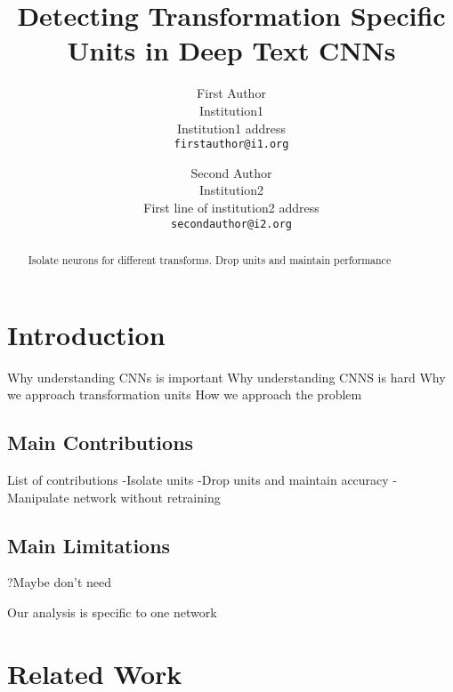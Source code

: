 \documentclass[10pt,twocolumn,letterpaper]{article}
\begin{document}
\title{Detecting Transformation Specific Units in Deep Text CNNs}

\author{First Author\\
Institution1\\
Institution1 address\\
{\tt\small firstauthor@i1.org}
\and
Second Author\\
Institution2\\
First line of institution2 address\\
{\tt\small secondauthor@i2.org}
}

\maketitle

\begin{abstract}
   Isolate neurons for different transforms.
   Drop units and maintain performance
\end{abstract}

\section{Introduction}

Why understanding CNNs is important
Why understanding CNNS is hard
Why we approach transformation units
How we approach the problem


\subsection{Main Contributions}

List of contributions
-Isolate units
-Drop units and maintain accuracy
-Manipulate network without retraining

\subsection{Main Limitations}

?Maybe don't need

Our analysis is specific to one network

\section{Related Work}
\end{document}
